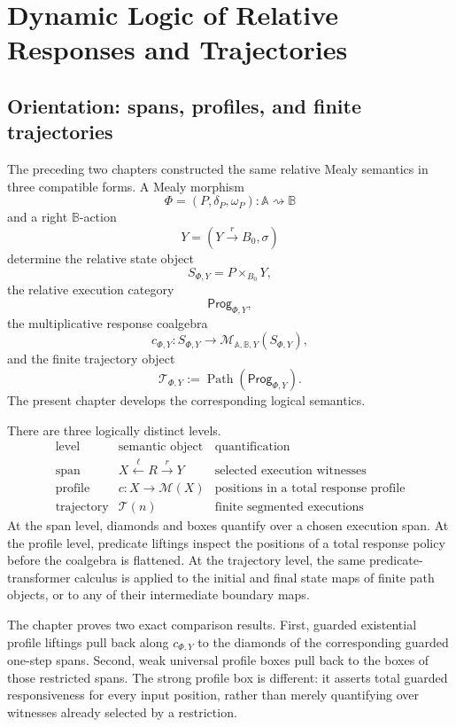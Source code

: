 
\chapter{Dynamic Logic of Relative Responses and Trajectories}
\label{ch:dynamic-relative-response-trajectories}

\section{Orientation: spans, profiles, and finite trajectories}
\label{sec:dynamic-response-trajectory-orientation}

The preceding two chapters constructed the same relative Mealy semantics in
three compatible forms.  A Mealy morphism
\[
    \Phi=(P,\delta_P,\omega_P):
    \mathbb A\rightsquigarrow\mathbb B
\]
and a right \(\mathbb B\)-action
\[
    Y=(Y\xrightarrow{r}B_0,\sigma)
\]
determine the relative state object
\[
    S_{\Phi,Y}=P\times_{B_0}Y,
\]
the relative execution category
\[
    \mathsf{Prog}_{\Phi,Y},
\]
the multiplicative response coalgebra
\[
    c_{\Phi,Y}:
    S_{\Phi,Y}\to
    \mathcal M_{\mathbb A,\mathbb B,Y}(S_{\Phi,Y}),
\]
and the finite trajectory object
\[
    \mathscr T_{\Phi,Y}
    :=
    \operatorname{Path}(\mathsf{Prog}_{\Phi,Y}).
\]
The present chapter develops the corresponding logical semantics.

There are three logically distinct levels.
\[
\begin{array}{c|c|c}
\text{level} & \text{semantic object} & \text{quantification}\\
\hline
\text{span} &
X\xleftarrow{\ell}R\xrightarrow{r}Y &
\text{selected execution witnesses}\\
\text{profile} &
c:X\to\mathcal M(X) &
\text{positions in a total response profile}\\
\text{trajectory} &
\mathscr T(n) &
\text{finite segmented executions}
\end{array}
\]
At the span level, diamonds and boxes quantify over a chosen execution span.
At the profile level, predicate liftings inspect the positions of a total
response policy before the coalgebra is flattened.  At the trajectory level,
the same predicate-transformer calculus is applied to the initial and final
state maps of finite path objects, or to any of their intermediate boundary
maps.

The chapter proves two exact comparison results.  First, guarded existential
profile liftings pull back along \(c_{\Phi,Y}\) to the diamonds of the
corresponding guarded one-step spans.  Second, weak universal profile boxes
pull back to the boxes of those restricted spans.  The strong profile box is
different: it asserts total guarded responsiveness for every input position,
rather than merely quantifying over witnesses already selected by a
restriction.

